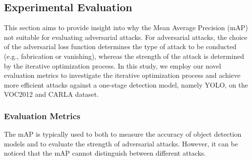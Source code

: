 
\subsection{Experimental Evaluation}

This section aims to provide insight into why the Mean Average Precision (mAP) not suitable for evaluating adversarial attacks. For adversarial attacks, the choice of the adversarial loss function determines the type of attack to be conducted (e.g., fabrication or vanishing), whereas the strength of the attack is determined by the iterative optimization process. In this study, we employ our novel evaluation metrics to investigate the  iterative optimization process  and achieve more efficient attacks against a one-stage detection model, namely YOLO, on the VOC2012 \citep{pascal-voc-2012} and CARLA \citep{deschaud2021kitticarla} dataset.


\subsubsection{Evaluation Metrics}

The mAP \citep{cartucho2018} is typically used to both to measure the accuracy of object detection models and to evaluate the strength of adversarial attacks. However, it can be noticed that the mAP cannot distinguish between different attacks. 

